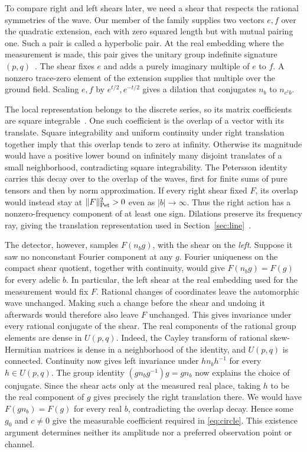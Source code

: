 \documentclass[11pt,letterpaper]{article}
\numberwithin{equation}{section}
\begin{document}
To compare right and left shears later, we need a shear that respects the rational symmetries of the wave. Our member of the family supplies two vectors $e,f$ over the quadratic extension, each with zero squared length but with mutual pairing one. Such a pair is called a hyperbolic pair. At the real embedding where the measurement is made, this pair gives the unitary group indefinite signature $(p,q)$~\cite{thetaoriginal,shearjoin}. The shear fixes $e$ and adds a purely imaginary multiple of $e$ to $f$. A nonzero trace-zero element of the extension supplies that multiple over the ground field. Scaling $e,f$ by $e^{t/2},e^{-t/2}$ gives a dilation that conjugates $n_b$ to $n_{e^t b}$.

The local representation belongs to the discrete series, so its matrix coefficients are square integrable~\cite{shearmetric}. One such coefficient is the overlap of a vector with its translate. Square integrability and uniform continuity under right translation together imply that this overlap tends to zero at infinity. Otherwise its magnitude would have a positive lower bound on infinitely many disjoint translates of a small neighborhood, contradicting square integrability. The Petersson identity carries this decay over to the overlap of the waves, first for finite sums of pure tensors and then by norm approximation. If every right shear fixed $F$, its overlap would instead stay at $\|F\|_{\rm Pet}^2>0$ even as $|b|\to\infty$. Thus the right action has a nonzero-frequency component of at least one sign. Dilations preserve its frequency ray, giving the translation representation used in Section~\ref{sec:line}~\cite{affine}.

The detector, however, samples $F(n_b g)$, with the shear on the \emph{left}. Suppose it saw no nonconstant Fourier component at any $g$. Fourier uniqueness on the compact shear quotient, together with continuity, would give $F(n_b g)=F(g)$ for every adelic $b$. In particular, the left shear at the real embedding used for the measurement would fix $F$. Rational changes of coordinates leave the automorphic wave unchanged. Making such a change before the shear and undoing it afterwards would therefore also leave $F$ unchanged. This gives invariance under every rational conjugate of the shear. The real components of the rational group elements are dense in $U(p,q)$. Indeed, the Cayley transform of rational skew-Hermitian matrices is dense in a neighborhood of the identity, and $U(p,q)$ is connected. Continuity now gives left invariance under $h n_b h^{-1}$ for every $h\in U(p,q)$. The group identity $(g n_b g^{-1})g=g n_b$ now explains the choice of conjugate. Since the shear acts only at the measured real place, taking $h$ to be the real component of $g$ gives precisely the right translation there. We would have $F(g n_b)=F(g)$ for every real $b$, contradicting the overlap decay. Hence some $g_0$ and $c\ne0$ give the measurable coefficient required in \eqref{eq:circle}. This existence argument determines neither its amplitude nor a preferred observation point or channel.
\end{document}
